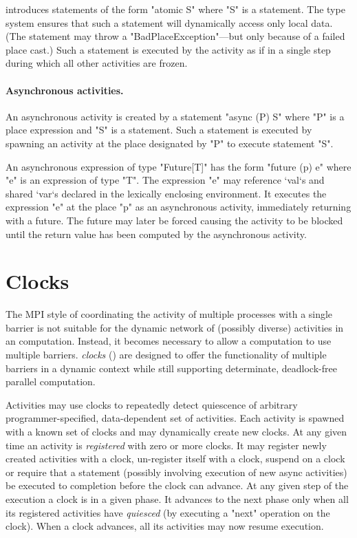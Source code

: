 \Xten{} introduces statements of the form \xcd"atomic S" where \xcd"S"
is a statement.  The type system ensures that such a statement will
dynamically access only local data. (The statement may throw
a \xcd"BadPlaceException"---but only because of a failed place cast.)
Such a statement is executed by the activity as if in a single step
during which all other activities are frozen.

\paragraph{Asynchronous activities.}

An asynchronous activity is created by a statement \xcd"async (P) S"
where \xcd"P" is a place expression and \xcd"S" is a statement.  Such
a statement is executed by spawning an activity at the place
designated by \xcd"P" to execute statement \xcd"S".

An asynchronous expression of type \xcd"Future[T]" has the form
\xcd"future (p) e" where \xcd"e" is an expression of type
\xcd"T".  The expression \xcd"e"
may reference \xcd`val`s and shared \xcd`var`s declared in the lexically
enclosing environment.  It executes the expression \xcd"e" at the
place \xcd"p" as an asynchronous activity, immediately returning with
a future. The future may later be forced causing the activity to be
blocked until the return value has been computed by the asynchronous
activity.

\section{Clocks}
The MPI style of coordinating the activity of multiple processes with
a single barrier is not suitable for the dynamic network of (possibly
diverse) activities in an \Xten{} computation. Instead, it becomes
necessary to allow a computation to use multiple barriers. \Xten{}
\emph{clocks} () are designed to offer the
functionality of multiple barriers in a dynamic context while still
supporting determinate, deadlock-free parallel computation.

Activities may use clocks to repeatedly detect quiescence of arbitrary
programmer-specified, data-dependent set of activities. Each activity
is spawned with a known set of clocks and may dynamically create new
clocks. At any given time an activity is \emph{registered} with zero or
more clocks. It may register newly created activities with a clock,
un-register itself with a clock, suspend on a clock or require that a
statement (possibly involving execution of new async activities) be
executed to completion before the clock can advance.  At any given
step of the execution a clock is in a given phase. It advances to the
next phase only when all its registered activities have \emph{quiesced}
(by executing a \xcd"next" operation on the clock).
When a clock advances, all its activities may now resume execution.

